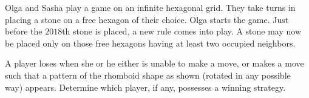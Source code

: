 Olga and Sasha play a game on an infinite hexagonal grid. They take turns in placing a stone on a free hexagon of their choice. Olga starts the game. Just before the $2018$th stone is placed, a new rule comes into play. A stone may now be placed only on those free hexagons having at least two occupied neighbors.

A player loses when she or he either is unable to make a move, or makes a move such that a pattern of the rhomboid shape as shown (rotated in any possible way) appears. Determine which player, if any, possesses a winning strategy.